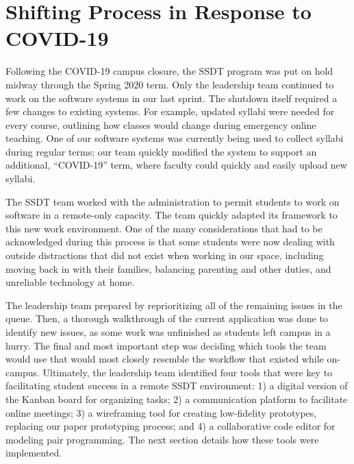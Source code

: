 \section{Shifting Process in Response to COVID-19}

Following the COVID-19 campus closure, the SSDT program was put on hold midway through the Spring 2020 term. Only the leadership team continued to work on the software systems in our last sprint. The shutdown itself required a few changes to existing systems. For example, updated syllabi were needed for every course, outlining how classes would change during emergency online teaching. One of our software systems was currently being used to collect syllabi during regular terms; our team quickly modified the system to support an additional, ``COVID-19'' term, where faculty could quickly and easily upload new syllabi.

The SSDT team worked with the administration to permit students to work on software in a remote-only capacity. The team quickly adapted its framework to this new work environment. One of the many considerations that had to be acknowledged during this process is that some students were now dealing with outside distractions that did not exist when working in our space, including moving back in with their families, balancing parenting and other duties, and unreliable technology at home.

The leadership team prepared by reprioritizing all of the remaining issues in the queue. Then, a thorough walkthrough of the current application was done to identify new issues, as some work was unfinished as students left campus in a hurry. The final and most important step was deciding which tools the team would use that would most closely resemble the workflow that existed while on-campus. Ultimately, the leadership team identified four tools that were key to facilitating student success in a remote SSDT environment: 1) a digital version of the Kanban board for organizing tasks; 2) a communication platform to facilitate online meetings; 3) a wireframing tool for creating low-fidelity prototypes, replacing our paper prototyping process; and 4) a collaborative code editor for modeling pair programming. The next section details how these tools were implemented.

